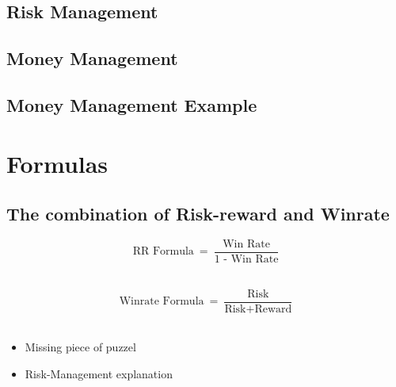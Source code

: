 \documentclass[] {article}
\begin{document}
\newpage

\subsection{Risk Management}
\subsection{Money Management}
\subsection{Money Management Example}

\newpage
\section{Formulas}

\subsection{The combination of Risk-reward and Winrate} \vspace{0.8cm}

\[ \text{RR Formula}\ =\ \frac{\text{Win Rate}}{\text{1}\text{ - Win Rate}} \] \

\[ \text{Winrate Formula}\ =\ \frac{\text{Risk}}{\text{Risk} + \text{Reward}}\] \

\begin{itemize}
    \item Missing piece of puzzel
    \item Risk-Management explanation
\end{itemize}

 
\end{document}
